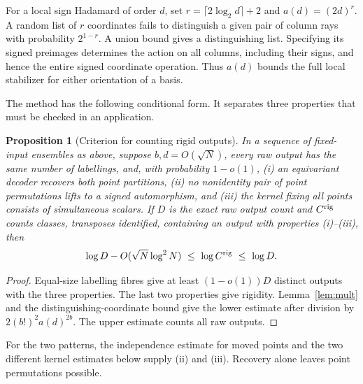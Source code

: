 \documentclass[11pt,reqno]{amsart}
\newtheorem{proposition}[theorem]{Proposition}
\theoremstyle{remark}\newtheorem{remark}[theorem]{Remark}
\begin{document}
For a local sign Hadamard of order \(d\), set \(r=\lceil2\log_2 d\rceil+2\) and \(a(d)=(2d)^r\). A random list of \(r\) coordinates fails to distinguish a given pair of column rays with probability \(2^{1-r}\). A union bound gives a distinguishing list. Specifying its signed preimages determines the action on all columns, including their signs, and hence the entire signed coordinate operation. Thus \(a(d)\) bounds the full local stabilizer for either orientation of a basis.

The method has the following conditional form. It separates three properties that must be checked in an application.
\begin{proposition}[Criterion for counting rigid outputs]\label{prop:criterion}
In a sequence of fixed-input ensembles as above, suppose \(b,d=O(\sqrt N)\), every raw output has the same number of labellings, and, with probability \(1-o(1)\), (i) an equivariant decoder recovers both point partitions, (ii) no nonidentity pair of point permutations lifts to a signed automorphism, and (iii) the kernel fixing all points consists of simultaneous scalars. If \(D\) is the exact raw output count and \(C^{\rm rig}\) counts classes, transposes identified, containing an output with properties (i)--(iii), then
\[
 \log D-O(\sqrt N\log^2 N)\ \le\ \log C^{\rm rig}\ \le\ \log D.
\]
\end{proposition}
\begin{proof}
Equal-size labelling fibres give at least \((1-o(1))D\) distinct outputs with the three properties. The last two properties give rigidity. Lemma~\ref{lem:mult} and the distinguishing-coordinate bound give the lower estimate after division by \(2(b!)^2a(d)^{2b}\). The upper estimate counts all raw outputs.
\end{proof}
For the two patterns, the independence estimate for moved points and the two different kernel estimates below supply (ii) and (iii). Recovery alone leaves point permutations possible.
\end{document}
